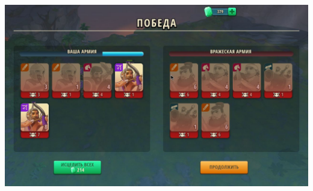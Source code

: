 \noindent\includegraphics[width=\linewidth]{./parts/media/TreasureHunt/37/decoder/photo_2022-04-14_12-36-46.jpg} \newline

